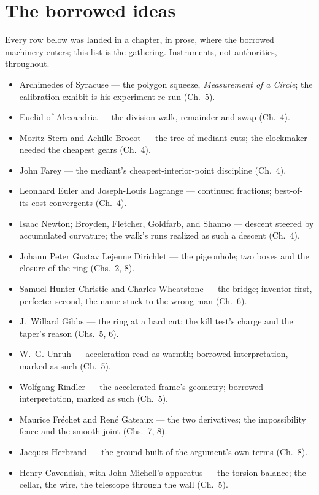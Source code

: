 \section*{The borrowed ideas}

Every row below was landed in a chapter, in prose, where the borrowed machinery
enters; this list is the gathering. Instruments, not authorities, throughout.

\begin{itemize}
\item Archimedes of Syracuse --- the polygon squeeze, \emph{Measurement of a
Circle}; the calibration exhibit is his experiment re-run (Ch.~5).
\item Euclid of Alexandria --- the division walk, remainder-and-swap (Ch.~4).
\item Moritz Stern and Achille Brocot --- the tree of mediant cuts; the
clockmaker needed the cheapest gears (Ch.~4).
\item John Farey --- the mediant's cheapest-interior-point discipline (Ch.~4).
\item Leonhard Euler and Joseph-Louis Lagrange --- continued fractions;
best-of-its-cost convergents (Ch.~4).
\item Isaac Newton; Broyden, Fletcher, Goldfarb, and Shanno --- descent steered
by accumulated curvature; the walk's runs realized as such a descent (Ch.~4).
\item Johann Peter Gustav Lejeune Dirichlet --- the pigeonhole; two boxes and
the closure of the ring (Chs.~2, 8).
\item Samuel Hunter Christie and Charles Wheatstone --- the bridge; inventor
first, perfecter second, the name stuck to the wrong man (Ch.~6).
\item J.~Willard Gibbs --- the ring at a hard cut; the kill test's charge and
the taper's reason (Chs.~5, 6).
\item W.~G. Unruh --- acceleration read as warmth; borrowed interpretation,
marked as such (Ch.~5).
\item Wolfgang Rindler --- the accelerated frame's geometry; borrowed
interpretation, marked as such (Ch.~5).
\item Maurice Fr\'echet and Ren\'e Gateaux --- the two derivatives; the
impossibility fence and the smooth joint (Chs.~7, 8).
\item Jacques Herbrand --- the ground built of the argument's own terms
(Ch.~8).
\item Henry Cavendish, with John Michell's apparatus --- the torsion balance;
the cellar, the wire, the telescope through the wall (Ch.~5).

\end{itemize}
